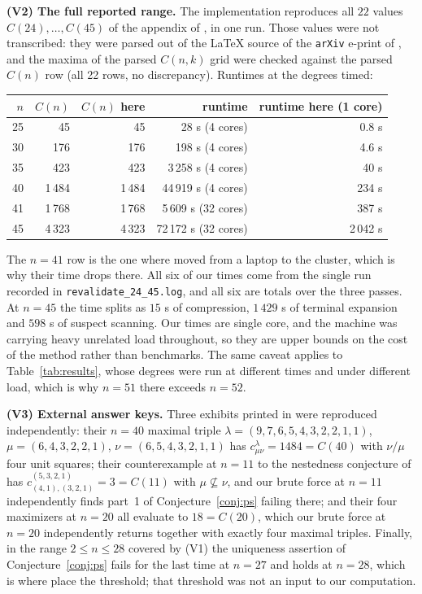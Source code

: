 \documentclass[11pt]{article}
\theoremstyle{remark}
\newcommand{\lam}{\lambda}
\begin{document}
\medskip
\noindent\textbf{(V2) The full reported range.} The implementation reproduces all $22$
values $C(24),\dots,C(45)$ of the appendix of \cite{PS26}, in one run. Those values were
not transcribed: they were parsed out of the \LaTeX{} source of the \texttt{arXiv}
e-print of \cite{PS26}, and the maxima of the parsed $C(n,k)$ grid were checked against
the parsed $C(n)$ row (all 22 rows, no discrepancy). Runtimes at the degrees
\cite{PS26} timed:

\begin{center}
\begin{tabular}{rrrrr}
\toprule
$n$ & $C(n)$ \cite{PS26} & $C(n)$ here & runtime \cite{PS26} & runtime here (1 core) \\
\midrule
25 & 45   & 45   & 28 s (4 cores) & 0.8 s \\
30 & 176  & 176  & 198 s (4 cores) & 4.6 s \\
35 & 423  & 423  & 3\,258 s (4 cores) & 40 s \\
40 & 1\,484 & 1\,484 & 44\,919 s (4 cores) & 234 s \\
41 & 1\,768 & 1\,768 & 5\,609 s (32 cores) & 387 s \\
45 & 4\,323 & 4\,323 & 72\,172 s (32 cores) & 2\,042 s \\
\bottomrule
\end{tabular}
\end{center}

\noindent
The $n=41$ row is the one where \cite{PS26} moved from a laptop to the cluster, which is
why their time drops there. All six of our times come from the single run recorded in
\texttt{revalidate\_24\_45.log}, and all six are totals over the three passes. At
$n=45$ the time splits as $15$ s of compression, $1\,429$ s of terminal expansion and
$598$ s of suspect scanning. Our times are single core, and the machine was carrying
heavy unrelated load throughout, so they are upper bounds on the cost of the method
rather than benchmarks. The same caveat applies to Table~\ref{tab:results}, whose
degrees were run at different times and under different load, which is why $n=51$
there exceeds $n=52$.

\medskip
\noindent\textbf{(V3) External answer keys.} Three exhibits printed in \cite{PS26} were
reproduced independently: their $n=40$ maximal triple $\lam=(9,7,6,5,4,3,2,2,1,1)$,
$\mu=(6,4,3,2,2,1)$, $\nu=(6,5,4,3,2,1,1)$ has $c^{\lam}_{\mu\nu}=1484=C(40)$ with
$\nu/\mu$ four unit squares; their counterexample at $n=11$ to the nestedness conjecture
of \cite{PPY19} has $c^{(5,3,2,1)}_{(4,1),(3,2,1)}=3=C(11)$ with $\mu\not\subseteq\nu$,
and our brute force at $n=11$ independently finds part~1 of Conjecture~\ref{conj:ps}
failing there; and their four maximizers at $n=20$ all evaluate to $18=C(20)$, which our
brute force at $n=20$ independently returns together with exactly four maximal triples.
Finally, in the range $2\le n\le 28$ covered by (V1) the uniqueness assertion of
Conjecture~\ref{conj:ps} fails for the last time at $n=27$ and holds at $n=28$, which is
where \cite{PS26} place the threshold; that threshold was not an input to our
computation.
\end{document}
